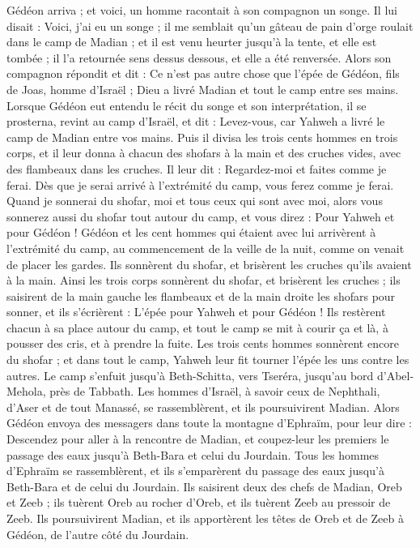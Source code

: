 \begin{multicols}{2}
Gédéon arriva ; et voici, un homme racontait à son compagnon un songe. Il lui disait : Voici, j'ai eu un songe ; il me semblait qu'un gâteau de pain d'orge roulait dans le camp de Madian ; et il est venu heurter jusqu’à la tente, et elle est tombée ; il l’a retournée sens dessus dessous, et elle a été renversée.
Alors son compagnon répondit et dit : Ce n'est pas autre chose que l'épée de Gédéon, fils de Joas, homme d'Israël ; Dieu a livré Madian et tout le camp entre ses mains.
Lorsque Gédéon eut entendu le récit du songe et son interprétation, il se prosterna, revint au camp d'Israël, et dit : Levez-vous, car Yahweh a livré le camp de Madian entre vos mains.
Puis il divisa les trois cents hommes en trois corps, et il leur donna à chacun des shofars à la main et des cruches vides, avec des flambeaux dans les cruches.
Il leur dit : Regardez-moi et faites comme je ferai. Dès que je serai arrivé à l’extrémité du camp, vous ferez comme je ferai.
Quand je sonnerai du shofar, moi et tous ceux qui sont avec moi, alors vous sonnerez aussi du shofar tout autour du camp, et vous direz : Pour Yahweh et pour Gédéon !
Gédéon et les cent hommes qui étaient avec lui arrivèrent à l’extrémité du camp, au commencement de la veille de la nuit, comme on venait de placer les gardes. Ils sonnèrent du shofar, et  brisèrent les cruches qu'ils avaient à la main.
Ainsi les trois corps sonnèrent du shofar, et brisèrent les cruches ; ils saisirent de la main gauche les flambeaux et de la main droite les shofars pour sonner, et ils s’écrièrent : L'épée pour Yahweh et pour Gédéon !
Ils restèrent chacun à sa place autour du camp, et tout le camp se mit à courir ça et là, à pousser des cris, et à prendre la fuite.
Les trois cents hommes sonnèrent encore du shofar ; et dans tout le camp, Yahweh leur fit tourner l'épée les uns contre les autres. Le camp s'enfuit jusqu'à Beth-Schitta, vers Tseréra, jusqu'au bord d'Abel-Mehola, près de Tabbath.
Les hommes d'Israël, à savoir ceux de Nephthali, d'Aser et de tout Manassé, se rassemblèrent, et ils poursuivirent Madian.
Alors Gédéon envoya des messagers dans toute la montagne d'Ephraïm, pour leur dire : Descendez pour aller à la rencontre de Madian, et coupez-leur les premiers le passage des eaux jusqu'à Beth-Bara et celui du Jourdain. Tous les hommes d'Ephraïm se rassemblèrent, et ils s’emparèrent du passage des eaux jusqu’à Beth-Bara et de celui du Jourdain.
Ils saisirent deux des chefs de Madian, Oreb et Zeeb ; ils tuèrent Oreb au rocher d’Oreb, et ils tuèrent Zeeb au pressoir de Zeeb. Ils poursuivirent Madian, et ils apportèrent les têtes de Oreb et de Zeeb à Gédéon, de l’autre côté du Jourdain.

\end{multicols}
